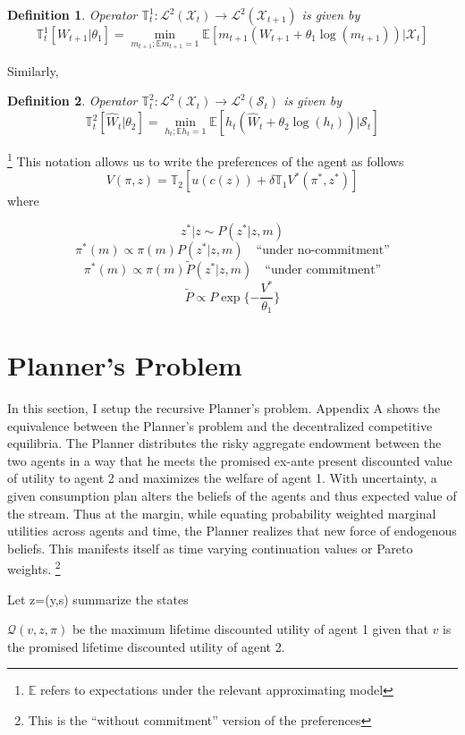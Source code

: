 \documentclass[12pt]{article}
\newtheorem{definition}{Definition}
\begin{document}
\begin{definition}
Operator $\mathbb{T}^1_t : \mathcal{L}^2(\mathcal{X}_{t}) \to \mathcal{L}^2(\mathcal{X}_{t+1}) $ is given by
\[\mathbb{T}^1_t[W_{t+1}|\theta_1] = \min_{m_{t+1}; \mathbb{E}m_{t+1}=1} \mathbb{E}\left[m_{t+1}\left( W_{t+1} +\theta_1 \log(m_{t+1})\right)| \mathcal{X}_t\right] \]
\end{definition}
\noindent Similarly, 
\begin{definition}
Operator $\mathbb{T}^2_t : \mathcal{L}^2(\mathcal{X}_{t}) \to \mathcal{L}^2(\mathcal{S}_t) $ is given by
\[\mathbb{T}^2_t[\hat{W}_t|\theta_2] = \min_{h_{t}; \mathbb{E}h_t=1} \mathbb{E}\left[h_{t}\left( \hat{W}_t +\theta_2 \log(h_{t})\right)| \mathcal{S}_t\right] \]
\end{definition}
\footnote{$\mathbb{E}$ refers to expectations under the relevant approximating model}
This notation allows us to write the preferences of the agent as follows
\[V(\pi,z)=\mathbb{T}_2\left[u(c(z))+\delta\mathbb{T}_1 V^*(\pi^*,z^*)\right]\]
where

\[z^*|z \sim P(z^*|z,m)\]
\[\pi^*(m) \propto \pi(m)P(z^*|z,m) \quad \text{``under no-commitment''}\]
\[\pi^*(m) \propto \pi(m)\tilde {P}(z^*|z,m) \quad \text{``under commitment''}\]
\[\tilde{P}\propto P\exp\{-\frac{V^*}{\theta_1}\}\]
\section{Planner's Problem}
In this section, I setup the recursive Planner's problem. Appendix A shows the equivalence between the Planner's problem and the decentralized competitive equilibria. The Planner distributes the risky aggregate endowment between the two agents in a way that he meets the promised ex-ante present discounted value of utility to agent 2 and maximizes the welfare of agent 1. With uncertainty, a given consumption plan alters the beliefs of the agents and thus expected value of the stream. Thus at the margin, while equating  probability weighted marginal utilities across agents and time, the Planner realizes that new force of endogenous beliefs. This manifests itself as time varying continuation values or Pareto weights.  \footnote{This is the ``without commitment'' version of the preferences}

\noindent  Let z=(y,s) summarize the states

\noindent $\mathcal{Q}(v,z,\pi)$ be the maximum lifetime discounted utility of agent 1 given that $v$ is the promised lifetime discounted utility of agent 2.
\end{document}
